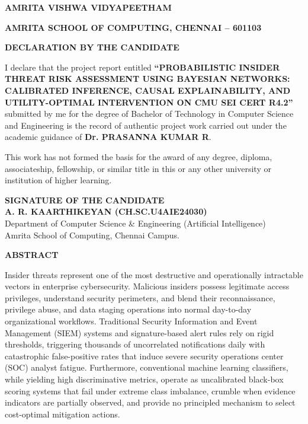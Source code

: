 \documentclass[12pt,a4paper]{report}
\begin{document}
\newpage
\begin{center}
{\fontsize{14}{17}\bfseries AMRITA VISHWA VIDYAPEETHAM\par}
{\fontsize{12}{15}\bfseries AMRITA SCHOOL OF COMPUTING, CHENNAI -- 601103\par}
\vspace{1.5cm}
{\fontsize{13}{16}\bfseries DECLARATION BY THE CANDIDATE\par}
\end{center}

\vspace{1.0cm}
\noindent I declare that the project report entitled \textbf{``PROBABILISTIC INSIDER THREAT RISK ASSESSMENT USING BAYESIAN NETWORKS: CALIBRATED INFERENCE, CAUSAL EXPLAINABILITY, AND UTILITY-OPTIMAL INTERVENTION ON CMU SEI CERT R4.2''} submitted by me for the degree of Bachelor of Technology in Computer Science and Engineering is the record of authentic project work carried out under the academic guidance of \textbf{Dr. PRASANNA KUMAR R}.

\noindent This work has not formed the basis for the award of any degree, diploma, associateship, fellowship, or similar title in this or any other university or institution of higher learning.

\vspace{3.5cm}
\noindent
\textbf{SIGNATURE OF THE CANDIDATE}\\[1.2cm]
\textbf{A. R. KAARTHIKEYAN (CH.SC.U4AIE24030)}\\
Department of Computer Science \& Engineering (Artificial Intelligence)\\
Amrita School of Computing, Chennai Campus.

\newpage
\begin{center}
{\fontsize{13}{16}\bfseries ABSTRACT\par}
\end{center}
\vspace{0.6cm}

Insider threats represent one of the most destructive and operationally intractable vectors in enterprise cybersecurity. Malicious insiders possess legitimate access privileges, understand security perimeters, and blend their reconnaissance, privilege abuse, and data staging operations into normal day-to-day organizational workflows. Traditional Security Information and Event Management (SIEM) systems and signature-based alert rules rely on rigid thresholds, triggering thousands of uncorrelated notifications daily with catastrophic false-positive rates that induce severe security operations center (SOC) analyst fatigue. Furthermore, conventional machine learning classifiers, while yielding high discriminative metrics, operate as uncalibrated black-box scoring systems that fail under extreme class imbalance, crumble when evidence indicators are partially observed, and provide no principled mechanism to select cost-optimal mitigation actions.
\end{document}
